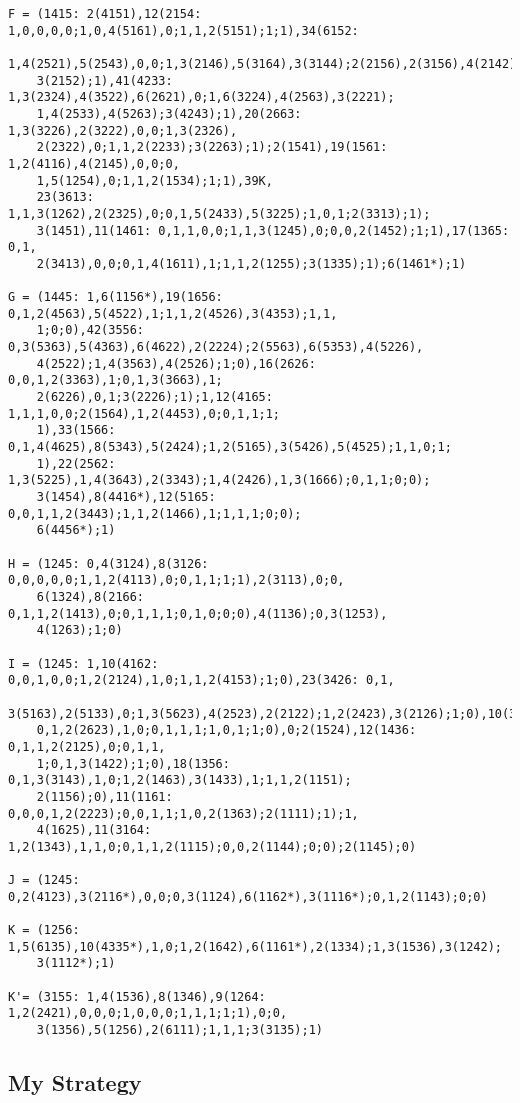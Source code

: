 \begin{verbatim}
F = (1415: 2(4151),12(2154: 1,0,0,0,0;1,0,4(5161),0;1,1,2(5151);1;1),34(6152: 
    1,4(2521),5(2543),0,0;1,3(2146),5(3164),3(3144);2(2156),2(3156),4(2142);
    3(2152);1),41(4233: 1,3(2324),4(3522),6(2621),0;1,6(3224),4(2563),3(2221);
    1,4(2533),4(5263);3(4243);1),20(2663: 1,3(3226),2(3222),0,0;1,3(2326),
    2(2322),0;1,1,2(2233);3(2263);1);2(1541),19(1561: 1,2(4116),4(2145),0,0;0,
    1,5(1254),0;1,1,2(1534);1;1),39K,
    23(3613: 1,1,3(1262),2(2325),0;0,1,5(2433),5(3225);1,0,1;2(3313);1);
    3(1451),11(1461: 0,1,1,0,0;1,1,3(1245),0;0,0,2(1452);1;1),17(1365: 0,1,
    2(3413),0,0;0,1,4(1611),1;1,1,2(1255);3(1335);1);6(1461*);1)

G = (1445: 1,6(1156*),19(1656: 0,1,2(4563),5(4522),1;1,1,2(4526),3(4353);1,1,
    1;0;0),42(3556: 0,3(5363),5(4363),6(4622),2(2224);2(5563),6(5353),4(5226),
    4(2522);1,4(3563),4(2526);1;0),16(2626: 0,0,1,2(3363),1;0,1,3(3663),1;
    2(6226),0,1;3(2226);1);1,12(4165: 1,1,1,0,0;2(1564),1,2(4453),0;0,1,1;1;
    1),33(1566: 0,1,4(4625),8(5343),5(2424);1,2(5165),3(5426),5(4525);1,1,0;1;
    1),22(2562: 1,3(5225),1,4(3643),2(3343);1,4(2426),1,3(1666);0,1,1;0;0);
    3(1454),8(4416*),12(5165: 0,0,1,1,2(3443);1,1,2(1466),1;1,1,1;0;0);
    6(4456*);1)

H = (1245: 0,4(3124),8(3126: 0,0,0,0,0;1,1,2(4113),0;0,1,1;1;1),2(3113),0;0,
    6(1324),8(2166: 0,1,1,2(1413),0;0,1,1,1;0,1,0;0;0),4(1136);0,3(1253),
    4(1263);1;0)

I = (1245: 1,10(4162: 0,0,1,0,0;1,2(2124),1,0;1,1,2(4153);1;0),23(3426: 0,1,
    3(5163),2(5133),0;1,3(5623),4(2523),2(2122);1,2(2423),3(2126);1;0),10(3166:
    0,1,2(2623),1,0;0,1,1,1;1,0,1;1;0),0;2(1524),12(1436: 0,1,1,2(2125),0;0,1,1,
    1;0,1,3(1422);1;0),18(1356: 0,1,3(3143),1,0;1,2(1463),3(1433),1;1,1,2(1151);
    2(1156);0),11(1161: 0,0,0,1,2(2223);0,0,1,1;1,0,2(1363);2(1111);1);1,
    4(1625),11(3164: 1,2(1343),1,1,0;0,1,1,2(1115);0,0,2(1144);0;0);2(1145);0)

J = (1245: 0,2(4123),3(2116*),0,0;0,3(1124),6(1162*),3(1116*);0,1,2(1143);0;0)

K = (1256: 1,5(6135),10(4335*),1,0;1,2(1642),6(1161*),2(1334);1,3(1536),3(1242);
    3(1112*);1)

K'= (3155: 1,4(1536),8(1346),9(1264: 1,2(2421),0,0,0;1,0,0,0;1,1,1;1;1),0;0,
    3(1356),5(1256),2(6111);1,1,1;3(3135);1)
\end{verbatim}
\normalsize

\subsection{My Strategy}


